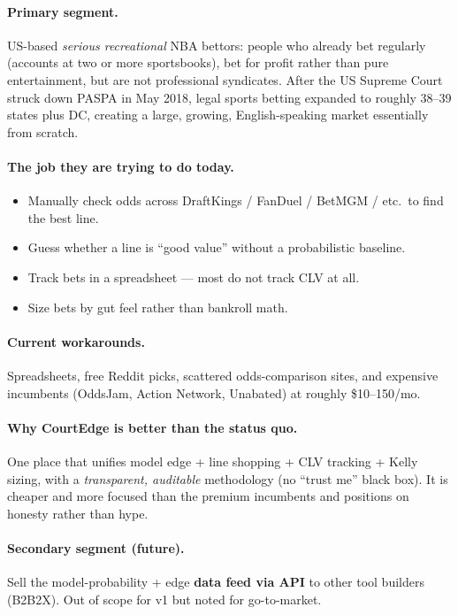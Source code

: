 \documentclass[12pt]{article}
\begin{document}
\paragraph{Primary segment.} US-based \emph{serious recreational} NBA bettors: people who
already bet regularly (accounts at two or more sportsbooks), bet for profit rather than pure
entertainment, but are not professional syndicates. After the US Supreme Court struck down
PASPA in May 2018, legal sports betting expanded to roughly 38--39 states plus DC, creating a
large, growing, English-speaking market essentially from scratch.

\paragraph{The job they are trying to do today.}
\begin{itemize}[nosep]
  \item Manually check odds across DraftKings / FanDuel / BetMGM / etc.\ to find the best line.
  \item Guess whether a line is ``good value'' without a probabilistic baseline.
  \item Track bets in a spreadsheet --- most do not track CLV at all.
  \item Size bets by gut feel rather than bankroll math.
\end{itemize}

\paragraph{Current workarounds.} Spreadsheets, free Reddit picks, scattered odds-comparison
sites, and expensive incumbents (OddsJam, Action Network, Unabated) at roughly \$10--150/mo.

\paragraph{Why CourtEdge is better than the status quo.} One place that unifies model edge +
line shopping + CLV tracking + Kelly sizing, with a \emph{transparent, auditable} methodology
(no ``trust me'' black box). It is cheaper and more focused than the premium incumbents and
positions on honesty rather than hype.

\paragraph{Secondary segment (future).} Sell the model-probability + edge \textbf{data feed via
API} to other tool builders (B2B2X). Out of scope for v1 but noted for go-to-market.
\end{document}
